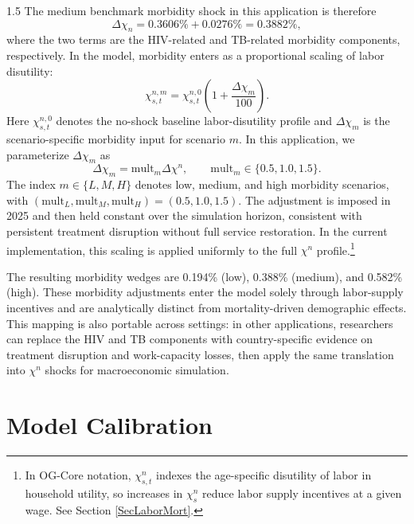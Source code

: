 \documentclass[letterpaper,12pt]{article}
\theoremstyle{definition}
\begin{document}
\begin{spacing}{1.5}
The medium benchmark morbidity shock in this application is therefore
\[
\Delta\chi_{n}=0.3606\%+0.0276\%=0.3882\%,
\]
where the two terms are the HIV-related and TB-related morbidity components, respectively. In the model, morbidity enters as a proportional scaling of labor disutility:
\[
\chi^{n,m}_{s,t}=\chi^{n,0}_{s,t}\left(1+\frac{\Delta\chi_m}{100}\right).
\]
Here $\chi^{n,0}_{s,t}$ denotes the no-shock baseline labor-disutility profile and $\Delta\chi_m$ is the scenario-specific morbidity input for scenario $m$. In this application, we parameterize $\Delta\chi_m$ as
\[
\Delta\chi_m=\mathrm{mult}_{m}\Delta\chi^{n},
\qquad
\mathrm{mult}_{m}\in\{0.5,1.0,1.5\}.
\]
The index $m\in\{L,M,H\}$ denotes low, medium, and high morbidity scenarios, with $(\mathrm{mult}_L, \mathrm{mult}_M, \mathrm{mult}_H) = (0.5,1.0,1.5)$. The adjustment is imposed in 2025 and then held constant over the simulation horizon, consistent with persistent treatment disruption without full service restoration. In the current implementation, this scaling is applied uniformly to the full $\chi^n$ profile.\footnote{In OG-Core notation, $\chi^n_{s,t}$ indexes the age-specific disutility of labor in household utility, so increases in $\chi^n_s$ reduce labor supply incentives at a given wage. See Section \ref{SecLaborMort}.}

The resulting morbidity wedges are 0.194\% (low), 0.388\% (medium), and 0.582\% (high). These morbidity adjustments enter the model solely through labor-supply incentives and are analytically distinct from mortality-driven demographic effects. This mapping is also portable across settings: in other applications, researchers can replace the HIV and TB components with country-specific evidence on treatment disruption and work-capacity losses, then apply the same translation into $\chi^n$ shocks for macroeconomic simulation.


\section{Model Calibration}\label{SecCalibration}


\end{spacing}
\end{document}
